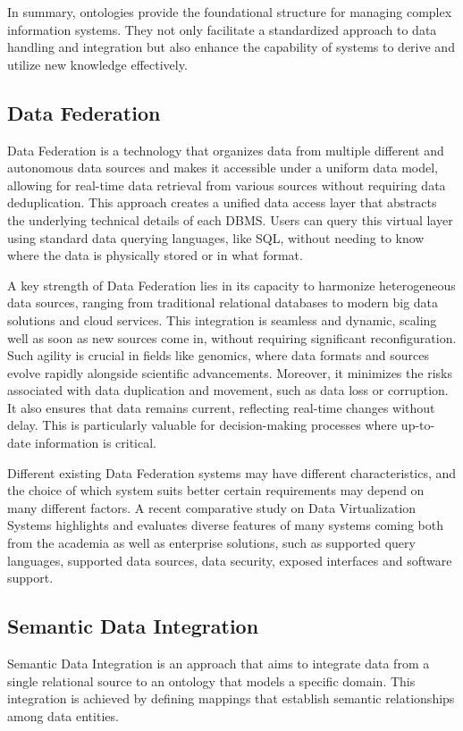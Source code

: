 In summary, ontologies provide the foundational structure for managing complex information systems. They not only facilitate a standardized approach to data handling and integration but also enhance the capability of systems to derive and utilize new knowledge effectively.

\subsection{Data Federation} \label{DF}
Data Federation is a technology that organizes data from multiple different and autonomous data sources and makes it accessible under a uniform data model, allowing for real-time data retrieval from various sources without requiring data deduplication. This approach creates a unified data access layer that abstracts the underlying technical details of each \ac{DBMS}. Users can query this virtual layer using standard data querying languages, like \ac{SQL}, without needing to know where the data is physically stored or in what format.

A key strength of Data Federation lies in its capacity to harmonize heterogeneous data sources, ranging from traditional relational databases to modern big data solutions and cloud services. This integration is seamless and dynamic, scaling well as soon as new sources come in, without requiring significant reconfiguration. Such agility is crucial in fields like genomics, where data formats and sources evolve rapidly alongside scientific advancements. Moreover, it minimizes the risks associated with data duplication and movement, such as data loss or corruption. It also ensures that data remains current, reflecting real-time changes without delay. This is particularly valuable for decision-making processes where up-to-date information is critical.

Different existing Data Federation systems may have different characteristics, and the choice of which system suits better certain requirements may depend on many different factors. A recent comparative study on Data Virtualization Systems \cite{DBLP:journals/semweb/GuCLMXXC24} highlights and evaluates diverse features of many systems coming both from the academia as well as enterprise solutions, such as supported query languages, supported data sources, data security, exposed interfaces and software support.

\subsection{Semantic Data Integration}
Semantic Data Integration is an approach that aims to integrate data from a single relational source to an ontology that models a specific domain. This integration is achieved by defining mappings that establish semantic relationships among data entities.

